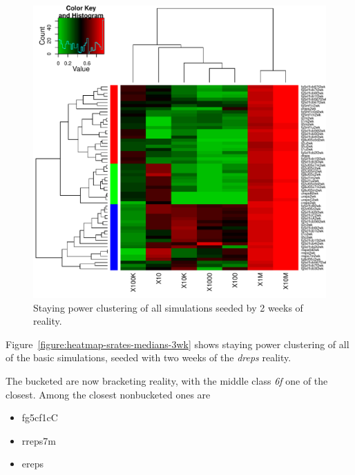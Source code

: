 \documentclass[10pt,oneside]{memoir}
\begin{document}
\begin{figure}
\begin{center}
    \includegraphics{figures/heatmap-srates-medians-2wk}
    \caption{Staying power clustering of all simulations seeded by 2 weeks of reality.}
    \label{figure:heatmap-srates-medians-2wk}
\end{center}
\end{figure}
Figure~\ref{figure:heatmap-srates-medians-3wk} shows staying power clustering of all of the basic simulations, seeded with two weeks of the {\itshape dreps} reality.


The bucketed are now bracketing reality, with the middle class {\itshape 6f} one of the closest.  Among the closest nonbucketed ones are


\begin{itemize}


\item fg5cf1cC 

\item rreps7m 

\item ereps
\end{itemize}
\end{document}
